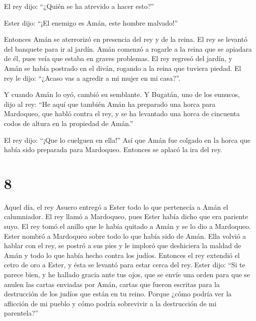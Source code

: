  El rey dijo: ``¿Quién se ha atrevido a hacer esto?''

 Ester dijo: ``¡El enemigo es Amán, este hombre malvado!''

Entonces Amán se aterrorizó en presencia del rey y de la reina.
 El rey se levantó del banquete para ir al jardín. Amán
comenzó a rogarle a la reina que se apiadara de él, pues veía que estaba
en graves problemas.  El rey regresó del jardín, y Amán se
había postrado en el diván, rogando a la reina que tuviera piedad. El
rey le dijo: ``¿Acaso vas a agredir a mi mujer en mi casa?''.

Y cuando Amán lo oyó, cambió su semblante.  Y Bugatán, uno
de los eunucos, dijo al rey: ``He aquí que también Amán ha preparado una
horca para Mardoqueo, que habló contra el rey, y se ha levantado una
horca de cincuenta codos de altura en la propiedad de Amán.''

El rey dijo: ``¡Que lo cuelguen en ella!''  Así que Amán
fue colgado en la horca que había sido preparada para Mardoqueo.
Entonces se aplacó la ira del rey.

\hypertarget{section-7}{%
\section{8}\label{section-7}}

 Aquel día, el rey Asuero entregó a Ester todo lo que
pertenecía a Amán el calumniador. El rey llamó a Mardoqueo, pues Ester
había dicho que era pariente suyo.  El rey tomó el anillo
que le había quitado a Amán y se lo dio a Mardoqueo. Ester nombró a
Mardoqueo sobre todo lo que había sido de Amán.  Ella
volvió a hablar con el rey, se postró a sus pies y le imploró que
deshiciera la maldad de Amán y todo lo que había hecho contra los
judíos.  Entonces el rey extendió el cetro de oro a Ester,
y ésta se levantó para estar cerca del rey.  Ester dijo:
``Si te parece bien, y he hallado gracia ante tus ojos, que se envíe una
orden para que se anulen las cartas enviadas por Amán, cartas que fueron
escritas para la destrucción de los judíos que están en tu reino.
 Porque ¿cómo podría ver la aflicción de mi pueblo y cómo
podría sobrevivir a la destrucción de mi parentela?''

